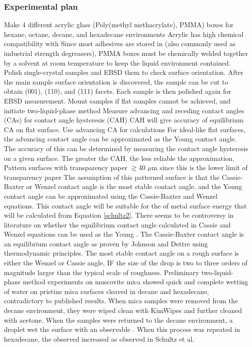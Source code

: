 \subsubsection{Experimental plan}
\begin{outline}[enumerate]
\1 Make 4 different acrylic glass (Poly(methyl methacrylate), PMMA) boxes for hexane, octane, decane, and hexadecane environments
	\2 Acrylic has high chemical compatibility with \nalk[s] \cite{Thermoscientific}		
	\2 Since most adhesives are stored in \nalk[s] (also commonly used as industrial strength degreasers), PMMA boxes must be chemically welded together by a solvent at room temperature to keep the liquid environment contained. 
\1 Polish single-crystal samples and EBSD them to check surface orientation. After the main sample surface orientation is discovered, the sample can be cut to obtain \hkl(001), \hkl(110), and \hkl(111) facets. Each sample is then polished again for EBSD measurement. 
\1 Mount samples if flat samples cannot be achieved, and initiate two-liquid-phase method
	\2 Measure advancing and receding contact angles (CAs) for contact angle hysteresis (CAH)
		\3 CAH will give accuracy of equilibrium CA on flat surface. 
	\2 Use advancing CA for calculations
		\3 For ideal-like flat surfaces, the advancing contact angle can be approximated as the Young contact angle. The accuracy of this can be determined by measuring the contact angle hysteresis on a given surface. The greater the CAH, the less reliable the approximation. 
\1 Pattern surfaces with transparency paper $\gtrsim$40 $\mu$m since this is the lower limit of transparency paper
	\2 The assumption of this patterned surface is that the Cassie-Baxter or Wenzel contact angle is the most stable contact angle, and the Young contact angle can be approximated using the Cassie-Baxter and Wenzel equations. This contact angle will be suitable for the of metal surface energy that will be calculated from Equation \ref{schultz2}.
		\3 There seems to be controversy in literature on whether the equilibrium contact angle calculated in Cassie and Wenzel equations can be used as the Young \ca.\cite{Attension2015,Marmur2009b,Bracco2013}
		\3 The Cassie-Baxter contact angle is an equilibrium contact angle as proven by Johnson and Dettre using thermodynamic principles.\cite{Johnson1964}
		\3 The most stable contact angle on a rough surface is either the Wenzel or Cassie angle, IF the size of the drop is two to three orders of magnitude larger than the typical scale of roughness.\cite{Meiron2004} %
	\2 Preliminary two-liquid-phase method experiments on muscovite mica showed quick and complete wetting of water on pristine mica surfaces cleaved in decane and hexadecane, contradictory to published results.\cite{Schultz1992} When mica samples were removed from the decane environment, they were wiped clean with KimWipes and further cleaned with acetone. When the samples were returned to the decane environment, a droplet wet the surface with an observable \ca. When this process was repeated in hexadecane, the observed \ca increased as observed in Schultz et al.\cite{Schultz1992} 
	

\end{outline}
